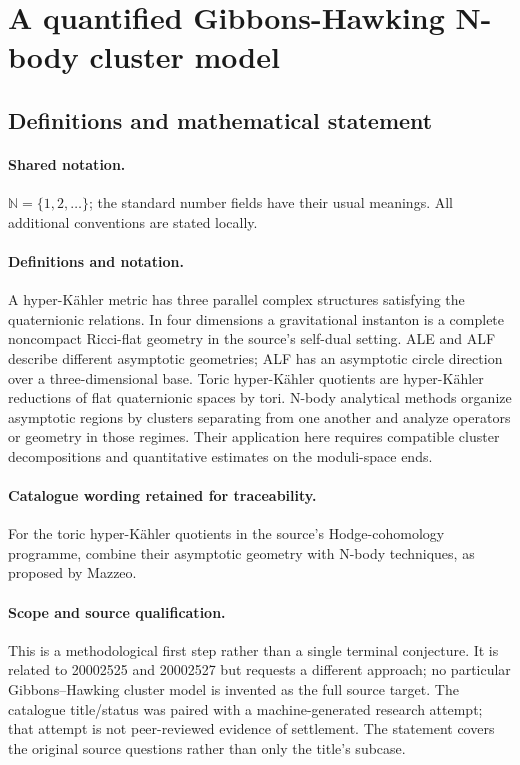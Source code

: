 \documentclass[11pt]{article}
\begin{document}
\section{A quantified Gibbons-Hawking N-body cluster model}\label{statement}

\subsection{Definitions and mathematical statement}

\paragraph{Shared notation.}$\mathbb N=\{1,2,\ldots\}$; the standard number fields have their usual meanings. All additional conventions are stated locally.


\paragraph{Definitions and notation.}A hyper-Kähler metric has three parallel complex structures satisfying the quaternionic relations. In four dimensions a gravitational instanton is a complete noncompact Ricci-flat geometry in the source’s self-dual setting. ALE and ALF describe different asymptotic geometries; ALF has an asymptotic circle direction over a three-dimensional base. Toric hyper-Kähler quotients are hyper-Kähler reductions of flat quaternionic spaces by tori. N-body analytical methods organize asymptotic regions by clusters separating from one another and analyze operators or geometry in those regimes. Their application here requires compatible cluster decompositions and quantitative estimates on the moduli-space ends.

\paragraph{Catalogue wording retained for traceability.}
For the toric hyper-Kähler quotients in the source’s Hodge-cohomology programme, combine their asymptotic geometry with N-body techniques, as proposed by Mazzeo.
\paragraph{Scope and source qualification.}This is a methodological first step rather than a single terminal conjecture. It is related to 20002525 and 20002527 but requests a different approach; no particular Gibbons–Hawking cluster model is invented as the full source target. The catalogue title/status was paired with a machine-generated research attempt; that attempt is not peer-reviewed evidence of settlement. The statement covers the original source questions rather than only the title’s subcase.
\end{document}
